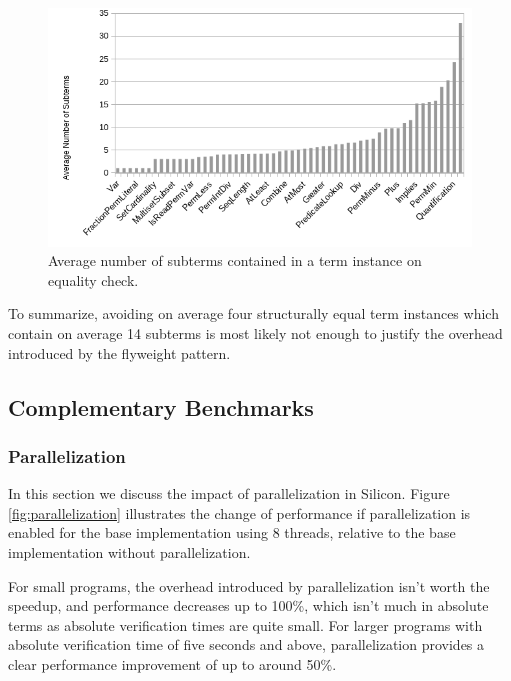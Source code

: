 \documentclass[11pt]{article}
\begin{document}
    \begin{figure}[H]
        \includegraphics[width=\linewidth]{node-count.png}
        \caption{Average number of subterms contained in a term instance on equality check.}
        \label{fig:node-count}
    \end{figure}

    To summarize, avoiding on average four structurally equal term instances which contain
    on average 14 subterms is most likely not enough to justify the overhead introduced by the flyweight pattern.


    \subsection{Complementary Benchmarks}

    \subsubsection{Parallelization}

    In this section we discuss the impact of
    parallelization in Silicon.
    Figure \ref{fig:parallelization} illustrates the change of performance
    if parallelization is enabled for the base implementation using 8 threads, relative to
    the base implementation without parallelization.

    For small programs, the overhead introduced by parallelization isn't worth
    the speedup, and performance decreases up to 100\%, which isn't much in absolute
    terms as absolute verification times are quite small. For larger programs
    with absolute verification time of five seconds and above, parallelization
    provides a clear performance improvement of up to around 50\%.
\end{document}
